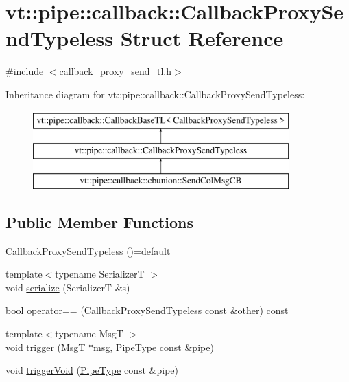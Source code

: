 \hypertarget{structvt_1_1pipe_1_1callback_1_1_callback_proxy_send_typeless}{}\section{vt\+:\+:pipe\+:\+:callback\+:\+:Callback\+Proxy\+Send\+Typeless Struct Reference}
\label{structvt_1_1pipe_1_1callback_1_1_callback_proxy_send_typeless}


{\ttfamily \#include $<$callback\+\_\+proxy\+\_\+send\+\_\+tl.\+h$>$}

Inheritance diagram for vt\+:\+:pipe\+:\+:callback\+:\+:Callback\+Proxy\+Send\+Typeless\+:\begin{figure}[H]
\begin{center}
\leavevmode
\includegraphics[height=3.000000cm]{structvt_1_1pipe_1_1callback_1_1_callback_proxy_send_typeless}
\end{center}
\end{figure}
\subsection*{Public Member Functions}
\begin{DoxyCompactItemize}
\item 
\hyperlink{structvt_1_1pipe_1_1callback_1_1_callback_proxy_send_typeless_a2b6bf89be0a074e8562b66fdb494bff4}{Callback\+Proxy\+Send\+Typeless} ()=default
\item 
{\footnotesize template$<$typename SerializerT $>$ }\\void \hyperlink{structvt_1_1pipe_1_1callback_1_1_callback_proxy_send_typeless_a242959ee9305f935040801ce121b7c1a}{serialize} (SerializerT \&s)
\item 
bool \hyperlink{structvt_1_1pipe_1_1callback_1_1_callback_proxy_send_typeless_a197f01ea6f98872018065f98b68906c7}{operator==} (\hyperlink{structvt_1_1pipe_1_1callback_1_1_callback_proxy_send_typeless}{Callback\+Proxy\+Send\+Typeless} const \&other) const
\item 
{\footnotesize template$<$typename MsgT $>$ }\\void \hyperlink{structvt_1_1pipe_1_1callback_1_1_callback_proxy_send_typeless_ad5d57986704d5a139737e0837200b2b7}{trigger} (MsgT $\ast$msg, \hyperlink{namespacevt_ac9852acda74d1896f48f406cd72c7bd3}{Pipe\+Type} const \&pipe)
\item 
void \hyperlink{structvt_1_1pipe_1_1callback_1_1_callback_proxy_send_typeless_a9f1f7823ce926d13d6c83c910a837dcb}{trigger\+Void} (\hyperlink{namespacevt_ac9852acda74d1896f48f406cd72c7bd3}{Pipe\+Type} const \&pipe)
\end{DoxyCompactItemize}


